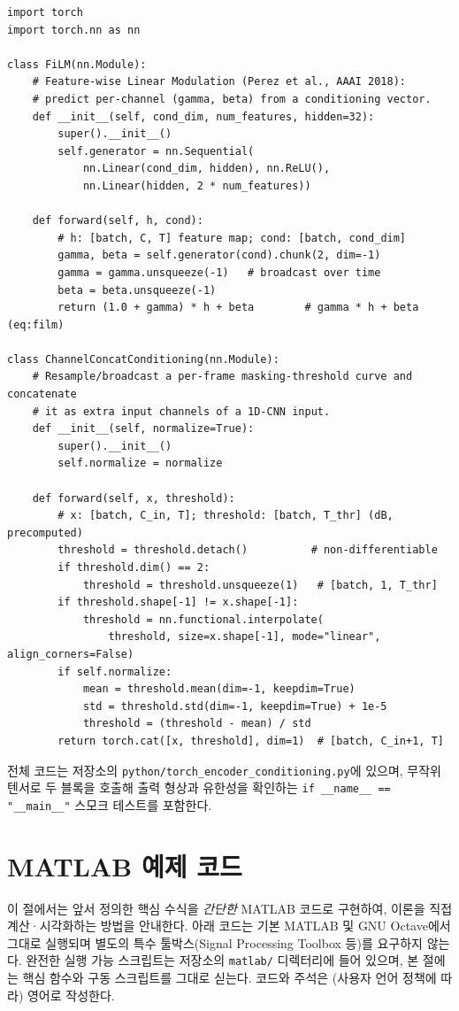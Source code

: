 \documentclass[11pt,a4paper]{article}
\begin{document}
\begin{lstlisting}[style=pythonstyle,caption={torch\_encoder\_conditioning.py --- FiLM modulation (eq:film) and channel-concatenation conditioning for a 1D-CNN encoder},label={lst:filmcond}]
import torch
import torch.nn as nn

class FiLM(nn.Module):
    # Feature-wise Linear Modulation (Perez et al., AAAI 2018):
    # predict per-channel (gamma, beta) from a conditioning vector.
    def __init__(self, cond_dim, num_features, hidden=32):
        super().__init__()
        self.generator = nn.Sequential(
            nn.Linear(cond_dim, hidden), nn.ReLU(),
            nn.Linear(hidden, 2 * num_features))

    def forward(self, h, cond):
        # h: [batch, C, T] feature map; cond: [batch, cond_dim]
        gamma, beta = self.generator(cond).chunk(2, dim=-1)
        gamma = gamma.unsqueeze(-1)   # broadcast over time
        beta = beta.unsqueeze(-1)
        return (1.0 + gamma) * h + beta        # gamma * h + beta (eq:film)

class ChannelConcatConditioning(nn.Module):
    # Resample/broadcast a per-frame masking-threshold curve and concatenate
    # it as extra input channels of a 1D-CNN input.
    def __init__(self, normalize=True):
        super().__init__()
        self.normalize = normalize

    def forward(self, x, threshold):
        # x: [batch, C_in, T]; threshold: [batch, T_thr] (dB, precomputed)
        threshold = threshold.detach()          # non-differentiable
        if threshold.dim() == 2:
            threshold = threshold.unsqueeze(1)   # [batch, 1, T_thr]
        if threshold.shape[-1] != x.shape[-1]:
            threshold = nn.functional.interpolate(
                threshold, size=x.shape[-1], mode="linear", align_corners=False)
        if self.normalize:
            mean = threshold.mean(dim=-1, keepdim=True)
            std = threshold.std(dim=-1, keepdim=True) + 1e-5
            threshold = (threshold - mean) / std
        return torch.cat([x, threshold], dim=1)  # [batch, C_in+1, T]
\end{lstlisting}

전체 코드는 저장소의 \texttt{python/torch\_encoder\_conditioning.py}에 있으며,
무작위 텐서로 두 블록을 호출해 출력 형상과 유한성을 확인하는
\texttt{if \_\_name\_\_ == "\_\_main\_\_"} 스모크 테스트를 포함한다.

\section{MATLAB 예제 코드}\label{sec:matlab}
이 절에서는 앞서 정의한 핵심 수식을 \emph{간단한} MATLAB 코드로 구현하여, 이론을
직접 계산·시각화하는 방법을 안내한다. 아래 코드는 기본 MATLAB 및 GNU Octave에서
그대로 실행되며 별도의 특수 툴박스(Signal Processing Toolbox 등)를 요구하지 않는다.
완전한 실행 가능 스크립트는 저장소의 \texttt{matlab/} 디렉터리에 들어 있으며, 본
절에는 핵심 함수와 구동 스크립트를 그대로 싣는다. 코드와 주석은 (사용자 언어 정책에
따라) 영어로 작성한다.
\end{document}
